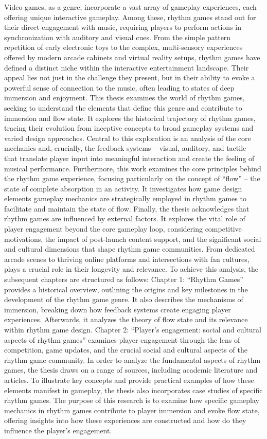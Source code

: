 Video games, as a genre, incorporate a vast array of gameplay experiences, each offering unique interactive gameplay. Among these, rhythm games stand out for their direct engagement with music, requiring players to perform actions in synchronization with auditory and visual cues. From the simple pattern repetition of early electronic toys to the complex, multi-sensory experiences offered by modern arcade cabinets and virtual reality setups, rhythm games have defined a distinct niche within the interactive entertainment landscape. Their appeal lies not just in the challenge they present, but in their ability to evoke a powerful sense of connection to the music, often leading to states of deep immersion and enjoyment.
This thesis examines the world of rhythm games, seeking to understand the elements that define this genre and contribute to immersion and flow state. It explores the historical trajectory of rhythm games, tracing their evolution from inceptive concepts to broad gameplay systems and varied design approaches. Central to this exploration is an analysis of the core mechanics and, crucially, the feedback systems -- visual, auditory, and tactile -- that translate player input into meaningful interaction and create the feeling of musical performance.
Furthermore, this work examines the core principles behind the rhythm game experience, focusing particularly on the concept of “flow” -- the state of complete absorption in an activity. It investigates how game design elements  gameplay mechanics are strategically employed in rhythm games to facilitate and maintain the state of flow.
Finally, the thesis acknowledges that rhythm games are influenced by external factors. It explores the vital role of player engagement beyond the core gameplay loop, considering competitive motivations, the impact of post-launch content support, and the significant social and cultural dimensions that shape rhythm game communities. From dedicated arcade scenes to thriving online platforms and intersections with fan cultures, plays a crucial role in their longevity and relevance. 
To achieve this analysis, the subsequent chapters are structured as follows: Chapter 1: “Rhythm Games” provides a historical overview, outlining the origins and key milestones in the development of the rhythm game genre. It also describes the mechanisms of immersion, breaking down how feedback systems create engaging player experiences. Afterwards, it analyzes the theory of flow state and its relevance within rhythm game design. Chapter 2: “Player’s engagement: social and cultural aspects of rhythm games” examines player engagement through the lens of competition, game updates, and the crucial social and cultural aspects of the rhythm game community.
In order to analyze the fundamental aspects of rhythm games, the thesis draws on a range of sources, including academic literature and articles. To illustrate key concepts and provide practical examples of how these elements manifest in gameplay, the thesis also incorporates case studies of specific rhythm games.
The purpose of this research is to examine how specific gameplay mechanics in rhythm games contribute to player immersion and evoke flow state, offering insights into how these experiences are constructed and how do they influence the player’s engagement.